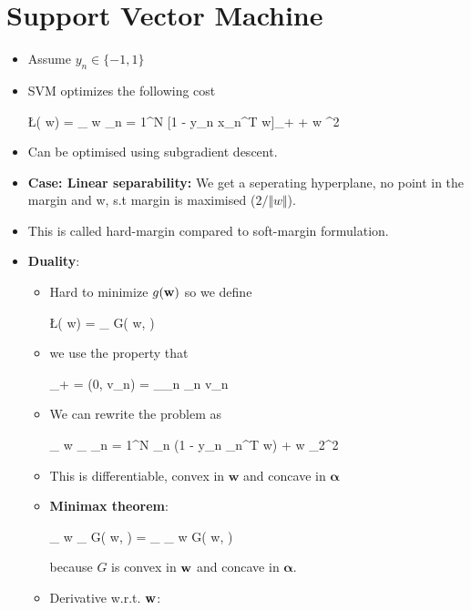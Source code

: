 \section{Support Vector Machine} 
\begin{itemize}
	\item Assume $y_n \in \{-1, 1\}$
	\item SVM optimizes the following cost
	\begin{myalign*}
	    \L(\* w) = \min_{\* w} \sum_{n = 1}^N [1 - \*y_n x_n^T \* w]_+ +  \lVert \*w \lVert^2
	\end{myalign*}
	\item Can be optimised using subgradient descent.
	\item \textbf{Case: Linear separability:} We get a seperating hyperplane, no point in the margin and w, s.t margin is maximised ($2/\Vert w \Vert$).
	\item This is called hard-margin compared to soft-margin formulation.
	\item \textbf{Duality}:
	\begin{itemize}
		\item Hard to minimize $g(\mathbf{w})$ so we define
		\begin{myalign*}
		    \L(\* w) = \max_{\bm \alpha} G(\* w, \bm \alpha)
		\end{myalign*}
		\item we use the property that
		\begin{myalign*}
		    [\*v_n]_+ = \max(0, \*v_n) = \max_{\alpha_n \in [0, 1]} \alpha_n \*v_n
		\end{myalign*}
		\item We can rewrite the problem as
		\begin{myalign*}
		    \min_{\* w} \max_{\alpha} \sum_{n = 1}^N \alpha_n (1 - \*y_n \bm \phi_n^T \* w) +  \lVert \*w \lVert_2^2 
		\end{myalign*}
		\item This is differentiable, convex in $\bm w$ and concave in $\bm \alpha$
		\item \textbf{Minimax theorem}: 
		\begin{myalign*}
		    \min_{\* w} \max_{\bm \alpha} G(\* w, \bm \alpha) = \max_{\bm \alpha} \min_{\* w} G(\* w, \bm \alpha)
		\end{myalign*}
		because $G$ is convex in $\mathbf{w}$ and concave in $\bm \alpha$.
		\item Derivative w.r.t. $\mathbf{w}$:
		\begin{myalign*}

\end{myalign*}
\end{itemize}
\end{itemize}

